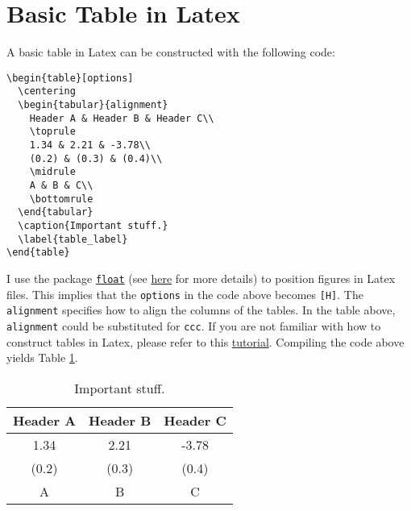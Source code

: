 \documentclass[12pt, a4paper]{article}
\begin{document}
\section{Basic Table in Latex}
\label{sec:orgfa10632}
A basic table in Latex can be constructed with the following code:
\lstset{language=[LaTeX]TeX,label= ,caption= ,captionpos=b,numbers=none,numbers=left, frame=single}
\begin{lstlisting}
\begin{table}[options]
  \centering
  \begin{tabular}{alignment}
    Header A & Header B & Header C\\
    \toprule
    1.34 & 2.21 & -3.78\\
    (0.2) & (0.3) & (0.4)\\
    \midrule
    A & B & C\\
    \bottomrule
  \end{tabular}
  \caption{Important stuff.}
  \label{table_label}
\end{table}
\end{lstlisting}
I use the package \href{https://ctan.org/tex-archive/macros/latex/contrib/float/}{\texttt{float}} (see \href{https://en.wikibooks.org/wiki/LaTeX/Floats,\_Figures\_and\_Captions\#Figures}{here} for more details) to position figures in Latex files.
This implies that the \texttt{options} in the code above becomes \texttt{[H]}.
The \texttt{alignment} specifies how to align the columns of the tables.
In the table above, \texttt{alignment} could be substituted for \texttt{ccc}.
If you are not familiar with how to construct tables in Latex, please refer to this \href{https://en.wikibooks.org/wiki/LaTeX/Tables\#The\_tabular\_environment}{tutorial}.
Compiling the code above yields Table \ref{tbl:890_matlab_sample_table}.

\begin{table}[H]
  \centering
  \begin{tabular}{ccc}
    Header A & Header B & Header C\\
    \toprule
    1.34 & 2.21 & -3.78\\
    (0.2) & (0.3) & (0.4)\\
    \midrule
    A & B & C\\
    \bottomrule
  \end{tabular}
\caption{Important stuff.}
\label{tbl:890_matlab_sample_table}
\end{table}
\end{document}
